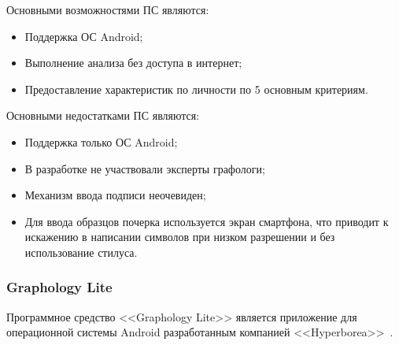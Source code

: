 Основными возможностями ПС являются:
\begin{itemize}
  \item Поддержка ОС Android;
  \item Выполнение анализа без доступа в интернет;
  \item Предоставление характеристик по личности по 5 основным критериям.
\end{itemize}

Основными недостатками ПС являются:
\begin{itemize}
  \item Поддержка только ОС Android;
  \item В разработке не участвовали эксперты графологи;
  \item Механизм ввода подписи неочевиден;
  \item Для ввода образцов почерка используется экран смартфона, что приводит к искажению в написании символов при низком разрешении и без использование стилуса.
\end{itemize}

\subsubsection{Graphology Lite}
\label{sub:domain:analogs:graphology_lite}

Программное средство <<Graphology Lite>> является приложение для операционной системы Android разработанным компанией <<Hyperborea>>~\cite{analogs_graphology_sign_analysis}.

